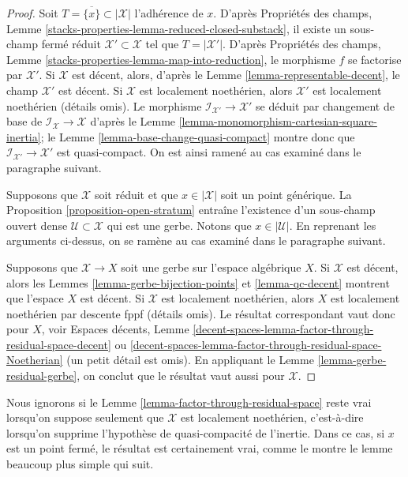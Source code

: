 \begin{proof}
Soit $T = \overline{\{x\}} \subset |\mathcal{X}|$ l'adh\'erence de $x$.
D'apr\`es Propri\'et\'es des champs, Lemme
\ref{stacks-properties-lemma-reduced-closed-substack},
il existe un sous-champ ferm\'e r\'eduit $\mathcal{X}' \subset \mathcal{X}$
tel que $T = |\mathcal{X}'|$. D'apr\`es Propri\'et\'es des champs, Lemme
\ref{stacks-properties-lemma-map-into-reduction}, le
morphisme $f$ se factorise par $\mathcal{X}'$. Si $\mathcal{X}$ est d\'ecent,
alors, d'apr\`es le Lemme \ref{lemma-representable-decent}, le champ
$\mathcal{X}'$ est d\'ecent. Si $\mathcal{X}$ est localement noeth\'erien,
alors $\mathcal{X}'$ est localement noeth\'erien (d\'etails omis).
Le morphisme $\mathcal{I}_{\mathcal{X}'} \to \mathcal{X}'$
se d\'eduit par changement de base de $\mathcal{I}_\mathcal{X} \to \mathcal{X}$ d'apr\`es le
Lemme \ref{lemma-monomorphism-cartesian-square-inertia};
le Lemme \ref{lemma-base-change-quasi-compact} montre donc que
$\mathcal{I}_{\mathcal{X}'} \to \mathcal{X}'$ est quasi-compact.
On est ainsi ramen\'e au cas examin\'e dans le paragraphe suivant.

\medskip\noindent
Supposons que $\mathcal{X}$ soit r\'eduit et que $x \in |\mathcal{X}|$
soit un point g\'en\'erique. La Proposition \ref{proposition-open-stratum}
entra\^ine l'existence d'un sous-champ ouvert dense
$\mathcal{U} \subset \mathcal{X}$ qui est une gerbe.
Notons que $x \in |\mathcal{U}|$.
En reprenant les arguments ci-dessus, on se ram\`ene au cas examin\'e
dans le paragraphe suivant.

\medskip\noindent
Supposons que $\mathcal{X} \to X$ soit une gerbe sur l'espace alg\'ebrique $X$.
Si $\mathcal{X}$ est d\'ecent, alors les
Lemmes \ref{lemma-gerbe-bijection-points} et \ref{lemma-qc-decent}
montrent que l'espace $X$ est d\'ecent. Si $\mathcal{X}$ est localement noeth\'erien,
alors $X$ est localement noeth\'erien par descente fppf (d\'etails omis).
Le r\'esultat correspondant vaut donc pour $X$, voir Espaces d\'ecents, Lemme
\ref{decent-spaces-lemma-factor-through-residual-space-decent} ou
\ref{decent-spaces-lemma-factor-through-residual-space-Noetherian}
(un petit d\'etail est omis).
En appliquant le Lemme \ref{lemma-gerbe-residual-gerbe}, on conclut que le r\'esultat
vaut aussi pour $\mathcal{X}$.
\end{proof}

\begin{remark}
\label{lemma-factor-through-residual-space-Noetherian}
Nous ignorons si le Lemme \ref{lemma-factor-through-residual-space}
reste vrai lorsqu'on suppose seulement que $\mathcal{X}$ est localement noeth\'erien,
c'est-\`a-dire lorsqu'on supprime l'hypoth\`ese de quasi-compacit\'e de l'inertie. Dans ce cas,
si $x$ est un point ferm\'e, le r\'esultat est certainement vrai, comme le montre le
lemme beaucoup plus simple qui suit.
\end{remark}

